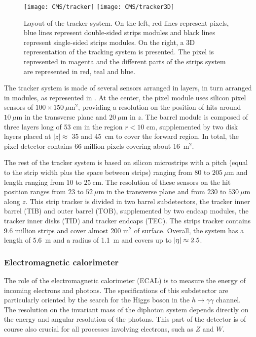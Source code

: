     \begin{figure}[h!]
        \centering
        \texttt{[image: CMS/tracker]}
        \texttt{[image: CMS/tracker3D]}
        \caption{Layout of the tracker system.
        On the left, red lines represent pixels, blue lines represent double-sided
        strips modules and black lines represent single-sided strips modules. On the
        right, a 3D representation of the tracking system is presented. The pixel
        is represented in magenta and the different parts of the strips system are
        represented in red, teal and blue.}
        \label{fig:CMS/tracker}
    \end{figure}

    The tracker system is made of several sensors arranged in layers, in turn arranged
    in modules, as represented in . At the center, the pixel module
    uses silicon pixel sensors of $100 \times 150~\mu\text{m}^2$, providing a resolution
    on the position of hits around $10~\mu\text{m}$ in the transverse plane and
    $20~\mu\text{m}$ in $z$. The barrel module is composed of three layers long of 53 cm in the
    region $r < 10$ cm, supplemented by two disk layers placed at $\left|z\right| \approx$
    35 and 45~cm to cover the forward region. In total, the pixel detector contains 66
    million pixels covering about 16~m$^2$.

    The rest of the tracker system is based on silicon microstrips with a pitch (equal
    to the strip width plus the space between strips) ranging
    from $80$ to $205~\mu\text{m}$ and length ranging from $10$ to $25~\text{cm}$.
    The resolution of these sensors on the hit position ranges from $23$ to $52~\mu\text{m}$
    in the transverse plane and from $230$ to $530~\mu\text{m}$ along $z$.
    This strip tracker is divided in two barrel subdetectors, the tracker inner barrel
    (TIB) and outer barrel (TOB), supplemented by two endcap modules, the tracker inner
    disks (TID) and tracker endcaps (TEC). The strips tracker contains 9.6 million strips
    and cover almost 200 m$^2$ of surface. Overall, the system has a length of 5.6~m
    and a radius of 1.1~m and covers up to $\left| \eta \right| \approx 2.5$.

        \subsubsection{Electromagnetic calorimeter}

    The role of the electromagnetic calorimeter (ECAL) is to measure the energy of incoming electrons
    and photons. The specifications of this subdetector are particularly oriented by
    the search for the Higgs boson in the $h \rightarrow \gamma \gamma$ channel. The resolution on the
    invariant mass of the diphoton system depends directly on the energy and angular
    resolution of the photons. This part of the detector is of course also crucial for
    all processes involving electrons, such as $Z$ and $W$.

